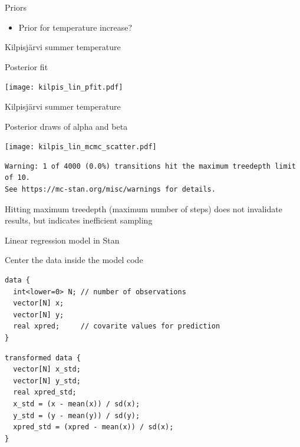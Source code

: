 \documentclass[finnish,english,t]{beamer}
\begin{document}
\begin{frame}{Priors}

  \begin{itemize}
  \item Prior for temperature increase?
  \end{itemize}

\end{frame}

\begin{frame}{Kilpisjärvi summer temperature}

  Posterior fit
  
  \begin{center}
    \texttt{[image: kilpis\_lin\_pfit.pdf]}
  \end{center}

\end{frame}

\begin{frame}[fragile]{Kilpisjärvi summer temperature}
  
  Posterior draws of alpha and beta
  
  \begin{center}
    \texttt{[image: kilpis\_lin\_mcmc\_scatter.pdf]}
  \end{center}

\scriptsize
{}
\begin{verbatim}
Warning: 1 of 4000 (0.0%) transitions hit the maximum treedepth limit of 10.
See https://mc-stan.org/misc/warnings for details.
\end{verbatim}
\small
Hitting maximum treedepth (maximum number of steps) does not
invalidate results, but indicates inefficient sampling
  
\end{frame}

\begin{frame}[fragile]{Linear regression model in Stan}

Center the data inside the model code
  
{\footnotesize
\begin{verbatim}
data {
  int<lower=0> N; // number of observations
  vector[N] x; 
  vector[N] y; 
  real xpred;     // covarite values for prediction
}
\end{verbatim}
\begin{verbatim}
transformed data {
  vector[N] x_std;
  vector[N] y_std;
  real xpred_std;
  x_std = (x - mean(x)) / sd(x);
  y_std = (y - mean(y)) / sd(y);
  xpred_std = (xpred - mean(x)) / sd(x);
}
\end{verbatim}
}
\end{frame}
\end{document}
